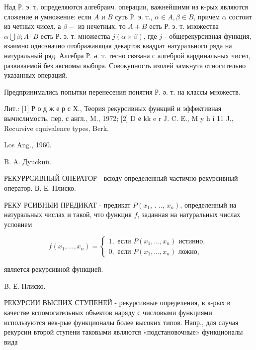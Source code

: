 \documentclass[10pt]{article}
\begin{document}
Над Р. э. т. определяются алгебраич. операции, важнейшими из к-рых являются сложение и умножение: если $A$ и $B$ суть Р. э. т., $\alpha \in A, \beta \in B$, причем $\alpha$ состоит из четных чисел, а $\beta-$ из нечетных, то $A+B$ есть Р. э. т. множества $\alpha \bigcup \beta ; A \cdot B$ есть Р. э. т. множества $j(\alpha \times \beta)$, где $j$ - общерекурсивная функция, взаимно однозначно отображающая декартов квадрат натурального ряда на натуральный ряд. Алгебра Р. ә. т. тесно связана с алгеброй кардинальных чисел, развиваемой без аксиомы выбора. Совокупность изолей замкнута относительно указанных операций.



Предпринимались попытки перенесения понятия Р. ә. т. на классы множеств.



Лит.: [1] Р о д ж е р с Х., Теория рекурсивных функций и эффективная вычислимость, пер. с англ., M., 1972; [2] D е kk e r J. C. E., M y h i 11 J., Recursive equivalence types, Berk.

Los Ang., 1960.

B. A. Дyuckuü.



РЕКУРРСИВНЫЙ ОПЕРАТОР - всюду определенный частично рекурсивный оператор. В. Е. Плиско.



РЕКУ РСИВНЫИ ПРЕДИКАТ - предикат $P\left(x_{1}\right.$, . .., $\left.x_{n}\right)$, определенный на натуральных числах и такой, что функция $f$, заданная на натуральных числах условием



\[

f\left(x_{1}, \ldots, x_{n}\right)=\left\{\begin{array}{l}

1, \text { если } P\left(x_{1}, \ldots, x_{n}\right) \text { истинно, } \\

0, \text { если } P\left(x_{1}, \ldots, x_{n}\right) \text { ложно, }

\end{array}\right.

\]



является рекурсивной функцией.



B. Е. Плиско.



РЕКУРСИИ ВЫСІІИХ СТУПЕНЕЙ - рекурсивные определения, в к-рых в качестве вспомогательных объектов наряду с числовыми функциями используются нек-рые функционалы более высоких типов. Напр., для случая рекурсии второй ступени таковыми являются «подстановочные» функционалы вида
\end{document}
